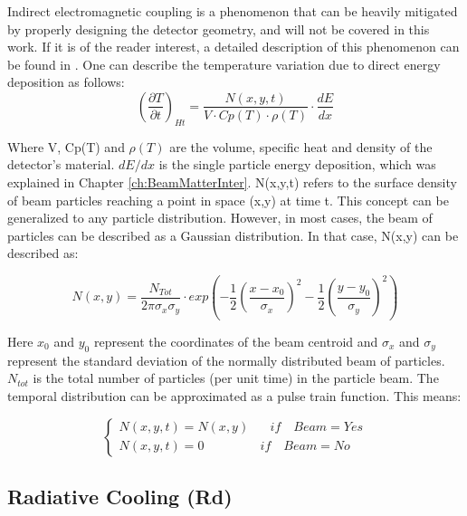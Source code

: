 Indirect electromagnetic coupling is a phenomenon that can be heavily mitigated by properly designing the detector geometry, and will not be covered in this work. If it is of the reader interest, a detailed description of this phenomenon can be found in \parencite[][]{ref:ElectroHeating}. One can describe the temperature variation due to direct energy deposition as follows: 
\begin{equation}
    \left(\frac{\partial T}{\partial t}\right)_{Ht} = \frac{N (x,y,t)}{V\cdot Cp(T)\cdot \rho (T)}\cdot \frac{dE}{dx}
\end{equation}

Where V, Cp(T) and $\rho (T)$ are the volume, specific heat and density of the detector's material. $dE/dx$ is the single particle energy deposition, which was explained in Chapter \ref{ch:BeamMatterInter}. N(x,y,t) refers to the surface density of beam particles reaching a point in space (x,y) at time t. This concept can be generalized to any particle distribution. However, in most cases, the beam of particles can be described as a Gaussian distribution. In that case, N(x,y) can be described as: 

\begin{equation}
    N(x,y) = \frac{N_{Tot}}{2 \pi \sigma_x \sigma_y}\cdot exp \left(
              -\frac{1}{2}\left(\frac{x-x_0}{\sigma_x}\right)^2 - \frac{1}{2}\left(\frac{y - y_0}{\sigma_y}\right)^2\right)
\end{equation}

Here $x_0$ and $y_0$ represent the coordinates of the beam centroid and $\sigma_x$ and $\sigma_y$ represent the standard deviation of the normally distributed beam of particles. $N_{tot}$ is the total number of particles (per unit time) in the particle beam. The temporal distribution can be approximated as a pulse train function. This means: 

\begin{equation}
    \begin{cases}
      N(x,y,t) = N(x,y) \mspace{30mu} if\mspace{18mu}Beam = Yes \\
      N(x,y,t) = 0 \mspace{80mu} if \mspace{18mu}Beam = No 
    \end{cases}
\end{equation}

\subsection{Radiative Cooling (Rd)}
\label{sec:RadiativeCooling}

